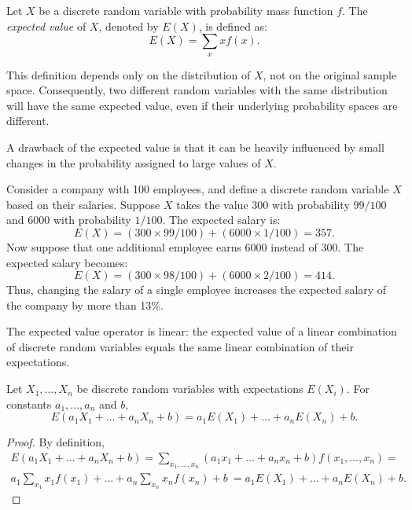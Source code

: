 \begin{definition}\label{probability:expectation}
Let $X$ be a discrete random variable with probability mass function $f$. The \emph{expected value} of $X$, denoted by $E(X)$, is defined as:
\[
E(X) = \sum_{x} x f(x).
\]
\end{definition}

This definition depends only on the distribution of $X$, not on the original sample space. Consequently, two different random variables with the same distribution will have the same expected value, even if their underlying probability spaces are different.

A drawback of the expected value is that it can be heavily influenced by small changes in the probability assigned to large values of $X$.

\begin{example}\label{ex:expected_salary}
Consider a company with 100 employees, and define a discrete random variable $X$ based on their salaries. Suppose $X$ takes the value $300$ with probability $99/100$ and $6000$ with probability $1/100$. The expected salary is:
\[
E(X) = (300 \times 99/100) + (6000 \times 1/100) = 357.
\]
Now suppose that one additional employee earns $6000$ instead of $300$. The expected salary becomes:
\[
E(X) = (300 \times 98/100) + (6000 \times 2/100) = 414.
\]
Thus, changing the salary of a single employee increases the expected salary of the company by more than 13\%.
\end{example}

The expected value operator is linear: the expected value of a linear combination of discrete random variables equals the same linear combination of their expectations.

\begin{proposition}
Let $X_{1}, \ldots, X_{n}$ be discrete random variables with expectations $E(X_{i})$. For constants $a_{1}, \ldots, a_{n}$ and $b$,
\[
E(a_{1}X_{1} + \ldots + a_{n}X_{n} + b) = a_{1}E(X_{1}) + \ldots + a_{n}E(X_{n}) + b.
\]
\end{proposition}
\begin{proof}
By definition,
\begin{equation*}
\begin{split}    
E(a_{1}X_{1} + \ldots + a_{n}X_{n} + b) =
\sum_{x_{1},\ldots,x_{n}} (a_{1}x_{1} + \ldots + a_{n}x_{n} + b) f(x_{1}, \ldots, x_{n}) = \\
a_{1} \sum_{x_{1}} x_{1} f(x_{1}) + \ldots + a_{n} \sum_{x_{n}} x_{n} f(x_{n}) + b
\ = a_{1}E(X_{1}) + \ldots + a_{n}E(X_{n}) + b.
\end{split}
\end{equation*}
\end{proof}

